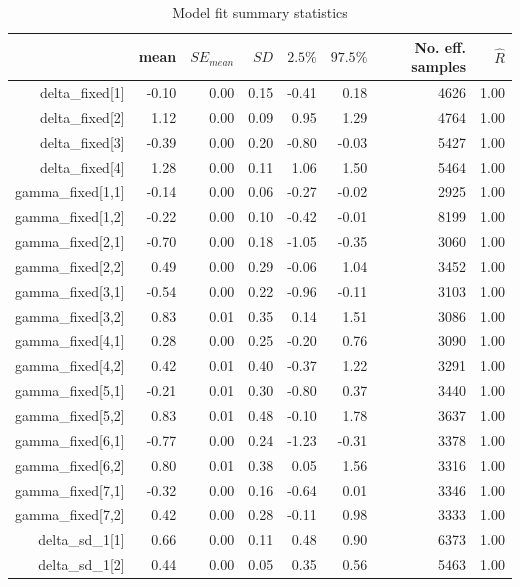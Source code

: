 \documentclass[oneside,a4paper]{article}
\begin{document}
\begin{table}[H]
\caption{Model fit summary statistics}
\label{tab:fitsum}
\begin{tabular}{rrrrrrrr}
  \hline
  & mean & $SE_{mean}$ & $SD$ & $2.5\%$ & $97.5\%$ & No. eff. samples & $\hat{R}$ \\ 
  \hline
  delta\_fixed[1] & -0.10 & 0.00 & 0.15 & -0.41 & 0.18 & 4626 & 1.00 \\ 
  delta\_fixed[2] & 1.12 & 0.00 & 0.09 & 0.95 & 1.29 & 4764 & 1.00 \\ 
  delta\_fixed[3] & -0.39 & 0.00 & 0.20 & -0.80 & -0.03 & 5427 & 1.00 \\ 
  delta\_fixed[4] & 1.28 & 0.00 & 0.11 & 1.06 & 1.50 & 5464 & 1.00 \\ 
  gamma\_fixed[1,1] & -0.14 & 0.00 & 0.06 & -0.27 & -0.02 & 2925 & 1.00 \\ 
  gamma\_fixed[1,2] & -0.22 & 0.00 & 0.10 & -0.42 & -0.01 & 8199 & 1.00 \\ 
  gamma\_fixed[2,1] & -0.70 & 0.00 & 0.18 & -1.05 & -0.35 & 3060 & 1.00 \\ 
  gamma\_fixed[2,2] & 0.49 & 0.00 & 0.29 & -0.06 & 1.04 & 3452 & 1.00 \\ 
  gamma\_fixed[3,1] & -0.54 & 0.00 & 0.22 & -0.96 & -0.11 & 3103 & 1.00 \\ 
  gamma\_fixed[3,2] & 0.83 & 0.01 & 0.35 & 0.14 & 1.51 & 3086 & 1.00 \\ 
  gamma\_fixed[4,1] & 0.28 & 0.00 & 0.25 & -0.20 & 0.76 & 3090 & 1.00 \\ 
  gamma\_fixed[4,2] & 0.42 & 0.01 & 0.40 & -0.37 & 1.22 & 3291 & 1.00 \\ 
  gamma\_fixed[5,1] & -0.21 & 0.01 & 0.30 & -0.80 & 0.37 & 3440 & 1.00 \\ 
  gamma\_fixed[5,2] & 0.83 & 0.01 & 0.48 & -0.10 & 1.78 & 3637 & 1.00 \\ 
  gamma\_fixed[6,1] & -0.77 & 0.00 & 0.24 & -1.23 & -0.31 & 3378 & 1.00 \\ 
  gamma\_fixed[6,2] & 0.80 & 0.01 & 0.38 & 0.05 & 1.56 & 3316 & 1.00 \\ 
  gamma\_fixed[7,1] & -0.32 & 0.00 & 0.16 & -0.64 & 0.01 & 3346 & 1.00 \\ 
  gamma\_fixed[7,2] & 0.42 & 0.00 & 0.28 & -0.11 & 0.98 & 3333 & 1.00 \\ 
  delta\_sd\_1[1] & 0.66 & 0.00 & 0.11 & 0.48 & 0.90 & 6373 & 1.00 \\ 
  delta\_sd\_1[2] & 0.44 & 0.00 & 0.05 & 0.35 & 0.56 & 5463 & 1.00 \\ 

\end{tabular}
\end{table}
\end{document}
